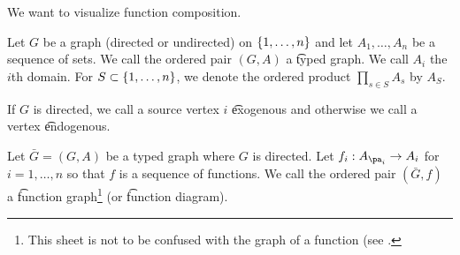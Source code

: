 

We want to visualize function composition.


Let $G$ be a graph (directed or undirected) on $\{1, \dots, n\}$ and let $A_1, \dots, A_n$ be a sequence of sets.
We call the ordered pair $(G, A)$ a \t{typed graph}.
We call $A_i$ the \t{$i$th domain}.
For $S \subset \{1, \dots, n\}$, we denote the ordered product $\prod_{s \in S} A_s$ by $A_S$.

If $G$ is directed, we call a source vertex $i$ \t{exogenous} and otherwise we call a vertex \t{endogenous}.

Let $\bar{G} = (G, A)$ be a typed graph where $G$ is directed.
Let $f_i: A_{\pa_{i}} \to A_i$ for $i = 1, \dots, n$ so that $f$ is a sequence of functions.
We call the ordered pair $(\bar{G}, f)$ a \t{function graph}\footnote{This sheet is not to be confused with the graph of a function (see .} (or \t{function diagram}).

\blankpage

